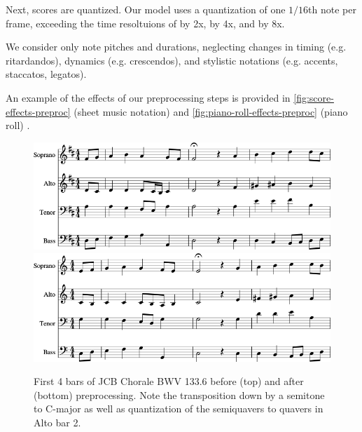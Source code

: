 \documentclass[dissertation.tex]{subfiles}
\begin{document}
Next, scores are quantized. Our model uses a quantization of one $1/16$th note
per frame, exceeding the time resoltuions of \cite{Boulanger-Lewandowski2012}
\cite{Eck2002} by 2x, \cite{hild1991harmonet} by 4x, and
\cite{bellgard1994harmonizing} by 8x.

We consider only note pitches and durations, neglecting changes in timing
(e.g. ritardandos), dynamics (e.g. crescendos), and stylistic notations (e.g.
accents, staccatos, legatos).

An example of the effects of our preprocessing steps is provided in
\autoref{fig:score-effects-preproc} (sheet music notation) and
\autoref{fig:piano-roll-effects-preproc} (piano roll) .

\begin{figure}[htbp]
    \centering
    \includegraphics[width=0.8\linewidth]{Figures/bwv133-6-original-score-1.png}
    \includegraphics[width=0.8\linewidth]{Figures/bwv133-6-preproc-score-1.png}
    \caption{First 4 bars of JCB Chorale BWV 133.6 before (top) and after (bottom) preprocessing. Note
    the transposition down by a semitone to C-major as well as quantization of the
    semiquavers to quavers in Alto bar 2.}
    \label{fig:score-effects-preproc}
\end{figure}
\end{document}
